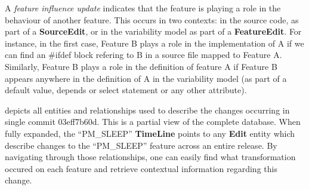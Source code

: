 A \emph{feature influence update} indicates that the feature is playing a role in the behaviour of another feature.
This occurs in two contexts: in the source code, as part of a \textbf{SourceEdit}, or in the variability model as 
part of a \textbf{FeatureEdit}. For instance, in the first case, Feature B plays a role in the implementation of A if we can find
an \#ifdef block refering to B in a source file mapped to Feature A. Similarly, Feature B plays a role in the definition of feature A
if Feature B appears anywhere in the definition of A in the variability model (as part of a default value, depends or select statement or any other attribute).

 depicts all entities and relationships used to describe the changes occurring in single commit
03eff7b60d. This is a partial view of the complete database. When fully expanded, the ``PM\_SLEEP'' \textbf{TimeLine} points to any
\textbf{Edit} entity which describe changes to the ``PM\_SLEEP'' feature across an entire release.
By navigating through those relationships, one can easily find what transformation occured on each feature and retrieve contextual information 
regarding this change.

